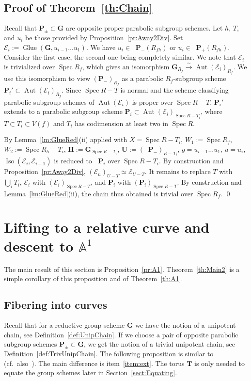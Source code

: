 \documentclass[11pt]{amsart}
\newcommand\A{\mathbb A}
\DeclareMathOperator\Ru{R_u}
\DeclareMathOperator\Glue{{Glue}}
\DeclareMathOperator\Spec{{Spec}}
\DeclareMathOperator{\Aut}{Aut}
\DeclareMathOperator{\Iso}{Iso}
\theoremstyle{plain}
\theoremstyle{definition}
\theoremstyle{remark}
\newcommand\cE{{\mathcal{E}}}
\newcommand\bT{{\mathbf T}}
\newcommand\bG{{\mathbf G}}
\newcommand\bP{{\mathbf P}}
\newcommand\bH{{\mathbf H}}
\newcommand\bU{{\mathbf U}}
\begin{document}
\subsection{Proof of Theorem~\ref{th:Chain}}
Recall that $\bP_\pm\subset\bG$ are opposite proper parabolic subgroup schemes. Let $h$, $T$, and $u_i$ be those provided by Proposition~\ref{pr:Away2Div}. Set $\cE_i:=\Glue(\bG,u_{i-1}\ldots u_1)$. We have $u_i\in\Ru\bP_-(R_{fh})$ or $u_i\in \Ru\bP_+(R_{fh})$. Consider the first case, the second one being completely similar. We note that $\cE_i$ is trivialized over $\Spec R_f$, which gives an isomorphism $\bG_{R_f}\xrightarrow{\sim}\Aut(\cE_i)_{R_f}$. We use this isomorphism to view $(\bP_-)_{R_f}$ as a parabolic $R_f$-subgroup scheme $\bP_i'\subset\Aut(\cE_i)_{R_f}$. Since $\Spec R-T$ is normal and the scheme classifying parabolic subgroup schemes of $\Aut(\cE_i)$ is proper over $\Spec R-T$, $\bP_i'$ extends to a parabolic subgroup scheme $\bP_i\subset\Aut(\cE_i)_{\Spec R-T_i}$, where $T\subset T_i\subset V(f)$ and $T_i$ has codimension at least two in $\Spec R$.

By Lemma~\ref{lm:GlueRed}(ii) applied with $X=\Spec R-T_i$, $W_1:=\Spec R_f$, $W_2:=\Spec R_h-T_i$, $\bH:=\bG_{\Spec R-T_i}$, $\bU:=(\Ru\bP_-)_{R-T_i}$, $g=u_{i-1}\ldots u_1$, $u=u_i$, $\Iso(\cE_i,\cE_{i+1})$ is reduced to $\Ru\bP_i$ over $\Spec R-T_i$. By construction and Proposition~\ref{pr:Away2Div}, $(\cE_n)_{U-T}\simeq\cE_{U-T}$. It remains to replace $T$ with $\bigcup_i T_i$, $\cE_i$ with $(\cE_i)_{\Spec R-T}$, and $\bP_i$ with $(\bP_i)_{\Spec R-T}$. By construction and Lemma~\ref{lm:GlueRed}(ii), the chain thus obtained is trivial over $\Spec R_f$.
\qed

\section{Lifting to a relative curve and descent to \texorpdfstring{$\A^1$}{A1}}\label{sect:Prepare}
The main result of this section is Proposition~\ref{pr:A1}. Theorem~\ref{th:Main2} is a simple corollary of this proposition and of Theorem~\ref{th:A1}.

\subsection{Fibering into curves}
Recall that for a reductive group scheme $\bG$ we have the notion of a unipotent chain, see Definition~\ref{def:UnipChain}. If we choose a pair of opposite parabolic subgroup schemes $\bP_\pm\subset\bG$, we get the notion of a trivial unipotent chain, see Definition~\ref{def:TrivUnipChain}. The following proposition is similar to~\cite[Prop.~4.2]{CesnaviciusGrSerre} (cf.\ also~\cite[Prop.~4.4]{FedorovMixedChar}). The main difference is item~\eqref{item:ext}. The torus $\bT$ is only needed to equate the group schemes later in Section~\ref{sect:Equating}.
\end{document}
